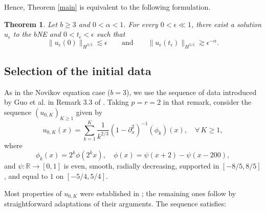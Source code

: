 \documentclass{amsart}
\newtheorem{theorem}{Theorem}
\begin{document}
Hence, Theorem \ref{main} is equivalent to the following formulation.

\begin{theorem}
Let $b\geq 3$ and $0<\alpha<1$. For every $0<\epsilon\ll1$, there exist a solution $u_\epsilon$ to the $b$NE  and $0<t_\epsilon<\epsilon$ such that 
\begin{equation}
\|u_\epsilon(0)\|_{H^{3/2}}\lesssim \epsilon \qquad\text{and}\qquad\|u_\epsilon(t_\epsilon)\|_{H^{3/2}}\gtrsim \epsilon^{-\alpha}.\label{0a}
\end{equation}
\label{main-2}
\end{theorem} 


\subsection*{Selection of the initial data}
As in the Novikov equation case ($b=3$), we use the sequence of data introduced by Guo et al. in Remark 3.3 of \cite{GLM19}. Taking $p=r=2$ in that remark, consider the sequence $(u_{0,K})_{K\geq 1}$ given by
\begin{equation*}
u_{0,K}(x)=\sum_{k=1}^K \frac{1}{k^{2/3}}(1-\partial^2_x)^{-1}(\phi_k)(x),\quad \forall\,K\geq 1,
\end{equation*}
where
\begin{equation*}
\phi_k(x)=2^k\phi(2^k x), \quad \phi(x)=\psi(x+2)-\psi(x-200),
\end{equation*}
and $\psi:\mathbb{R}\to [0,1]$ is even, smooth, radially decreasing, supported in $[-8/5,8/5]$, and equal to $1$ on $[-5/4, 5/4]$. 

Most properties of $u_{0,K}$ were established in \cite{GLM19}; the remaining ones follow by straightforward adaptations of their arguments. The sequence satisfies:
\end{document}
